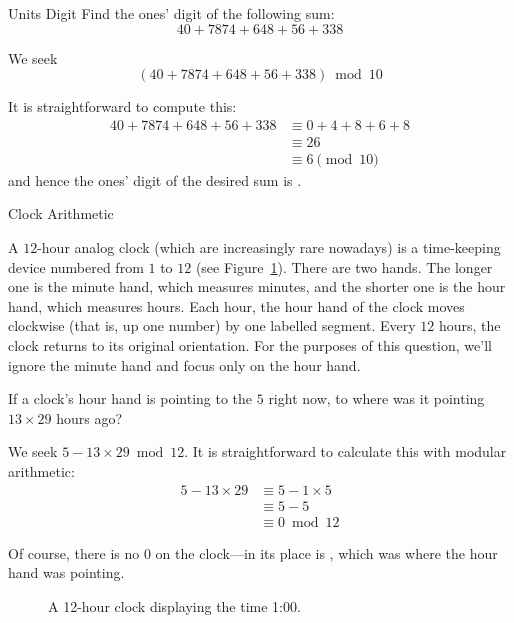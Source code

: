 \documentclass[a4paper,10pt]{report}
\begin{document}
\begin{problem}{Units Digit}
 Find the ones' digit of the following sum: \[
  40 + 7874 + 648 + 56 + 338
 \]

 \begin{solution}
  We seek \[
   (40 + 7874 + 648 + 56 + 338) \bmod 10
  \]

  It is straightforward to compute this: \begin{align*}
   40 + 7874 + 648 + 56 + 338
   &\equiv 0 + 4 + 8 + 6 + 8 \\
   &\equiv 26 \\
   &\equiv 6 \pmod {10}
  \end{align*}
  and hence the ones' digit of the desired sum is .
 \end{solution}
\end{problem}

\begin{problem}{Clock Arithmetic}

 A $12$-hour analog clock (which are increasingly rare nowadays) is a
 time-keeping device numbered from $1$ to $12$ (see Figure~\ref{ma:clock}).
 There are two hands. The longer one is the minute hand, which measures minutes,
 and the shorter one is the hour hand, which measures hours. Each hour, the hour
 hand of the clock moves clockwise (that is, up one number) by one labelled
 segment. Every $12$ hours, the clock returns to its original orientation. For
 the purposes of this question, we'll ignore the minute hand and focus only on
 the hour hand.

 If a clock's hour hand is pointing to the $5$ right now, to where was it
 pointing $13\times29$ hours ago?

 \begin{solution}
  We seek $5 - 13 \times 29 \bmod 12$. It is straightforward to calculate this
  with modular arithmetic: \begin{align*}
   5 - 13 \times 29
   &\equiv 5 - 1 \times 5 \\
   &\equiv 5 - 5 \\
   &\equiv 0 \bmod 12
  \end{align*}

  Of course, there is no $0$ on the clock---in its place is , which was
  where the hour hand was pointing.
 \end{solution}

\end{problem}

\begin{figure}

 \caption{A 12-hour clock displaying the time 1:00.}

 \label{ma:clock}
\end{figure}
\end{document}
